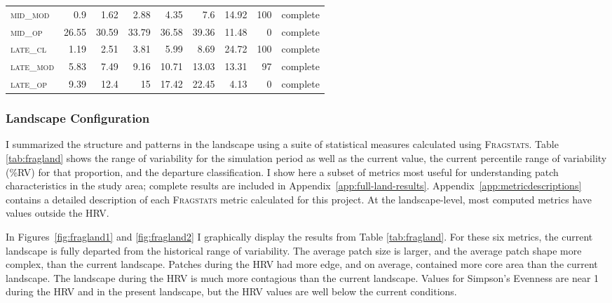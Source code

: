 \begin{table}[!htbp]
\begin{tabular}{@{}lrrrrr|rrr@{}}
 \textsc{mid\_mod  }      &  0.9           &  1.62     &  2.88     &  4.35     &  7.6       &  14.92       &   100    &  complete    \\
 \textsc{mid\_op   }      &  26.55         &  30.59    &  33.79    &  36.58    &  39.36     &  11.48       &   0      &  complete    \\
 \textsc{late\_cl  }      &  1.19          &  2.51     &  3.81     &  5.99     &  8.69      &  24.72       &   100    &  complete      \\
 \textsc{late\_mod }      &  5.83          &  7.49     &  9.16     &  10.71    &  13.03     &  13.31       &   97     &  complete     \\
 \textsc{late\_op  }      &  9.39          &  12.4     &  15       &  17.42    &  22.45     &  4.13        &   0      &   complete  \\ \bottomrule 
\end{tabular}
\end{table}

\clearpage



\subsubsection{Landscape Configuration}
I summarized the structure and patterns in the landscape using a suite of statistical measures calculated using \textsc{Fragstats}. Table \ref{tab:fragland} shows the range of variability for the simulation period as well as the current value, the current percentile range of variability (\%RV) for that proportion, and the departure classification. I show here a subset of metrics most useful for understanding patch characteristics in the study area; complete results are included in Appendix~\ref{app:full-land-results}.  Appendix~\ref{app:metricdescriptions} contains a detailed description of each \textsc{Fragstats} metric calculated for this project. At the landscape-level, most computed metrics have values outside the HRV. 

In Figures~\ref{fig:fragland1} and \ref{fig:fragland2} I graphically display the results from Table \ref{tab:fragland}. For these six metrics, the current landscape is fully departed from the historical range of variability. The average patch size is larger, and the average patch shape more complex, than the current landscape. Patches during the HRV had more edge, and on average, contained more core area than the current landscape. The landscape during the HRV is much more contagious than the current landscape. Values for Simpson's Evenness are near 1 during the HRV and in the present landscape, but the HRV values are well below the current conditions.

